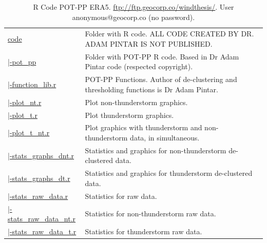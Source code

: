 \documentclass[12pt,twoside]{reedthesis}
\begin{document}
\begingroup\fontsize{7}{9}\selectfont
\begin{longtable}[t]{>{\raggedright\arraybackslash}p{1.3in}>{\raggedright\arraybackslash}p{4.9in}}
\caption[R Code POT-PP ERA5]{\label{tab:codeera5}R Code POT-PP ERA5. \href{ftp://ftp.geocorp.co/windthesis/}{ftp://ftp.geocorp.co/windthesis/}. User anonymous@geocorp.co (no password).}\\
\toprule
\multicolumn{1}{l}{Folder Tree - Ftp Links} & \multicolumn{1}{l}{Description}\\
\midrule
\href{ftp://ftp.geocorp.co/windthesis/code/}{code} & Folder with R code. ALL CODE CREATED BY DR. ADAM PINTAR IS NOT PUBLISHED.\\
\href{ftp://ftp.geocorp.co/windthesis/code/pot_pp/}{\;\;|-pot\_pp} & Folder with POT-PP R code. Based in Dr Adam Pintar code (respected copyright).\\
\href{ftp://ftp.geocorp.co/windthesis/code/pot_pp/function_lib.r}{\;\;\;\;|-function\_lib.r} & POT-PP Functions. Author of de-clustering and thresholding functions is Dr Adam Pintar.\\
\href{ftp://ftp.geocorp.co/windthesis/code/pot_pp/plot_nt.r}{\;\;\;\;|-plot\_nt.r} & Plot non-thunderstorm graphics.\\
\href{ftp://ftp.geocorp.co/windthesis/code/pot_pp/plot_t.r}{\;\;\;\;|-plot\_t.r} & Plot thunderstorm graphics.\\
\href{ftp://ftp.geocorp.co/windthesis/code/pot_pp/plot_t_nt.r}{\;\;\;\;|-plot\_t\_nt.r} & Plot graphics with thunderstorm and non-thunderstorm data, in simultaneous.\\
\href{ftp://ftp.geocorp.co/windthesis/code/pot_pp/statistics_and_graphics_declustered_nt.r}{\;\;\;\;|-stats\_graphs\_dnt.r} & Statistics and graphics for non-thunderstorm de-clustered data.\\
\href{ftp://ftp.geocorp.co/windthesis/code/pot_pp/statistics_and_graphics_declustered_t.r}{\;\;\;\;|-stats\_graphs\_dt.r} & Statistics and graphics for thunderstorm de-clustered data.\\
\href{ftp://ftp.geocorp.co/windthesis/code/pot_pp/statistics_raw_data.r}{\;\;\;\;|-stats\_raw\_data.r} & Statistics for raw data.\\
\href{ftp://ftp.geocorp.co/windthesis/code/pot_pp/statistics_raw_data_nt.r}{\;\;\;\;|-stats\_raw\_data\_nt.r} & Statistics for non-thunderstorm raw data.\\
\href{ftp://ftp.geocorp.co/windthesis/code/pot_pp/statistics_raw_data_t.r}{\;\;\;\;|-stats\_raw\_data\_t.r} & Statistics for thunderstorm raw data.\\

\end{longtable}
\end{document}
